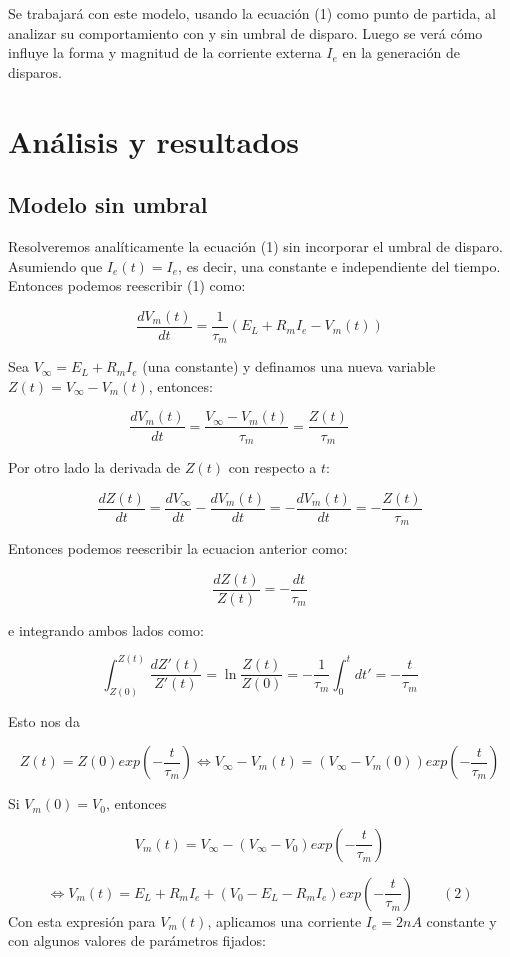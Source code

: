 \documentclass[12pt,letterpaper]{article}
\begin{document}
Se trabajará con este modelo, usando la ecuación (1) como punto de partida, al analizar su comportamiento con y sin umbral de disparo. Luego se verá cómo influye la forma y magnitud de la corriente externa $I_e$ en la generación de disparos.


\section{Análisis y resultados}

\subsection{Modelo sin umbral}

Resolveremos analíticamente la ecuación (1) sin incorporar el umbral de disparo. Asumiendo que $I_e(t) = I_e$, es decir, una constante e independiente del tiempo. Entonces podemos reescribir (1) como:

$$\dfrac{d V_m(t)}{d t} = \dfrac{1}{\tau_m}(E_L + R_m I_e - V_m(t))$$

Sea $V_{\infty} = E_L + R_m I_e$ (una constante) y definamos una nueva variable $Z(t) = V_{\infty} - V_m(t)$, entonces:  

$$\dfrac{d V_m(t)}{d t} = \dfrac{V_{\infty} - V_m(t)}{\tau_m} = \dfrac{Z(t)}{\tau_m} \hspace{3em} $$

Por otro lado la derivada de $Z(t)$ con respecto a $t$:

$$\dfrac{dZ(t)}{dt} = \dfrac{dV_{\infty}}{dt} - \dfrac{d V_m(t)}{dt} = -\dfrac{d V_m(t)}{dt} = - \dfrac{Z(t)}{\tau_m}$$

Entonces podemos reescribir la ecuacion anterior como:

$$\dfrac{dZ(t)}{Z(t)} = -\dfrac{dt}{\tau_m}$$

e integrando ambos lados como:

$$\int_{Z(0)}^{Z(t)} \frac{dZ'(t)}{Z'(t)} = \ln{\frac{Z(t)}{Z(0)}} = -\frac{1}{\tau_m}\int_{0}^{t} dt' = -\frac{t}{\tau_m}$$

Esto nos da 

$$Z(t) = Z(0)exp\left(- \dfrac{t}{\tau_m}\right) \iff V_{\infty} - V_m(t) = (V_{\infty} - V_m(0))exp\left(- \dfrac{t}{\tau_m}\right)$$

Si $V_m(0) = V_0$, entonces

$$V_m(t) = V_{\infty} - (V_{\infty} - V_0)exp\left(- \dfrac{t}{\tau_m}\right)
$$

$$\iff V_m(t) = E_L + R_m I_e + (V_0 - E_L - R_m I_e)exp\left(- \dfrac{t}{\tau_m}\right) \quad \quad (2)
$$
Con esta expresión para $V_m(t)$, aplicamos una corriente $I_e = 2nA$ constante y con algunos valores de parámetros fijados:
\end{document}
